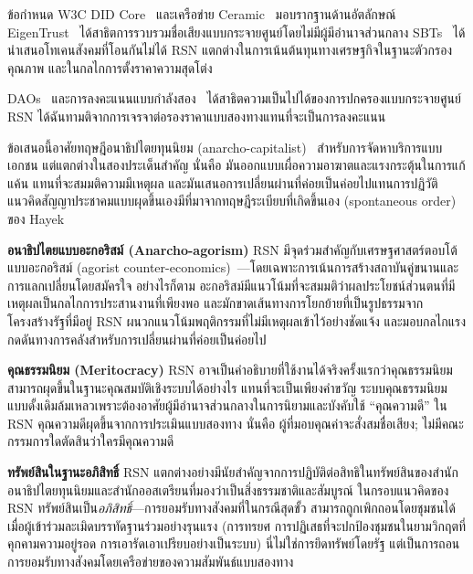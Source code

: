 \documentclass[11pt,a4paper,twocolumn]{article}
\begin{document}
ข้อกำหนด W3C DID Core~\cite{did2022} และเครือข่าย Ceramic~\cite{ceramic2023} มอบรากฐานด้านอัตลักษณ์ EigenTrust~\cite{kamvar2003} ได้สาธิตการรวบรวมชื่อเสียงแบบกระจายศูนย์โดยไม่มีผู้มีอำนาจส่วนกลาง SBTs~\cite{weyl2022} ได้นำเสนอโทเคนสังคมที่โอนกันไม่ได้ RSN แตกต่างในการเน้นต้นทุนทางเศรษฐกิจในฐานะตัวกรองคุณภาพ และในกลไกการตั้งราคาความสุดโต่ง

DAOs~\cite{buterin2014} และการลงคะแนนแบบกำลังสอง~\cite{buterin2019} ได้สาธิตความเป็นไปได้ของการปกครองแบบกระจายศูนย์ RSN ได้ฉันทามติจากการเจรจาต่อรองราคาแบบสองทางแทนที่จะเป็นการลงคะแนน

ข้อเสนอนี้อาศัยทฤษฎีอนาธิปไตยทุนนิยม (anarcho-capitalist)~\cite{rothbard1973,hoppe2001} สำหรับการจัดหาบริการแบบเอกชน แต่แตกต่างในสองประเด็นสำคัญ นั่นคือ มันออกแบบเผื่อความอาฆาตและแรงกระตุ้นในการแก้แค้น แทนที่จะสมมติความมีเหตุผล และมันเสนอการเปลี่ยนผ่านที่ค่อยเป็นค่อยไปแทนการปฏิวัติ แนวคิดสัญญาประชาคมแบบผุดขึ้นเองมีที่มาจากทฤษฎีระเบียบที่เกิดขึ้นเอง (spontaneous order) ของ Hayek~\cite{hayek1973}

\textbf{อนาธิปไตยแบบอะกอริสม์ (Anarcho-agorism)} RSN มีจุดร่วมสำคัญกับเศรษฐศาสตร์ตอบโต้แบบอะกอริสม์ (agorist counter-economics)~\cite{konkin2006}---โดยเฉพาะการเน้นการสร้างสถาบันคู่ขนานและการแลกเปลี่ยนโดยสมัครใจ อย่างไรก็ตาม อะกอริสม์มีแนวโน้มที่จะสมมติว่าผลประโยชน์ส่วนตนที่มีเหตุผลเป็นกลไกการประสานงานที่เพียงพอ และมักขาดเส้นทางการโยกย้ายที่เป็นรูปธรรมจากโครงสร้างรัฐที่มีอยู่ RSN ผนวกแนวโน้มพฤติกรรมที่ไม่มีเหตุผลเข้าไว้อย่างชัดแจ้ง และมอบกลไกแรงกดดันทางการคลังสำหรับการเปลี่ยนผ่านที่ค่อยเป็นค่อยไป

\textbf{คุณธรรมนิยม (Meritocracy)} RSN อาจเป็นคำอธิบายที่ใช้งานได้จริงครั้งแรกว่าคุณธรรมนิยม~\cite{young1958} สามารถผุดขึ้นในฐานะคุณสมบัติเชิงระบบได้อย่างไร แทนที่จะเป็นเพียงคำขวัญ ระบบคุณธรรมนิยมแบบดั้งเดิมล้มเหลวเพราะต้องอาศัยผู้มีอำนาจส่วนกลางในการนิยามและบังคับใช้ ``คุณความดี'' ใน RSN คุณความดีผุดขึ้นจากการประเมินแบบสองทาง นั่นคือ ผู้ที่มอบคุณค่าจะสั่งสมชื่อเสียง; ไม่มีคณะกรรมการใดตัดสินว่าใครมีคุณความดี

\textbf{ทรัพย์สินในฐานะอภิสิทธิ์} RSN แตกต่างอย่างมีนัยสำคัญจากการปฏิบัติต่อสิทธิในทรัพย์สินของสำนักอนาธิปไตยทุนนิยมและสำนักออสเตรียนที่มองว่าเป็นสิ่งธรรมชาติและสัมบูรณ์ ในกรอบแนวคิดของ RSN ทรัพย์สินเป็น\emph{อภิสิทธิ์}---การยอมรับทางสังคมที่ในกรณีสุดขั้ว สามารถถูกเพิกถอนโดยชุมชนได้เมื่อผู้เข้าร่วมละเมิดบรรทัดฐานร่วมอย่างรุนแรง (การทรยศ การปฏิเสธที่จะปกป้องชุมชนในยามวิกฤตที่คุกคามความอยู่รอด การเอารัดเอาเปรียบอย่างเป็นระบบ) นี่ไม่ใช่การยึดทรัพย์โดยรัฐ แต่เป็นการถอนการยอมรับทางสังคมโดยเครือข่ายของความสัมพันธ์แบบสองทาง
\end{document}
